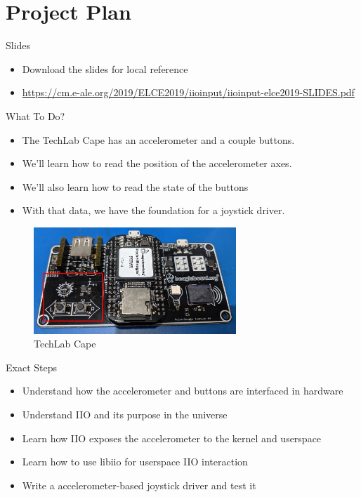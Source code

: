 \section{Project Plan}

\begin{frame}
	{Slides}

	\begin{itemize}
		\item
			Download the slides for local reference
		\item
			\url{https://cm.e-ale.org/2019/ELCE2019/iioinput/iioinput-elce2019-SLIDES.pdf}
	\end{itemize}
\end{frame}

\begin{frame}
	{What To Do?}

	\begin{itemize}
		\item
			The TechLab Cape has an accelerometer and a couple buttons.
		\item
			We'll learn how to read the position of the accelerometer axes.
		\item
			We'll also learn how to read the state of the buttons
		\item
			With that data, we have the foundation for a joystick driver.
	\end{itemize}

	     \begin{figure}[H]
		     \includegraphics[width=3in]{IMAGES/techlab-annotated}
				       \caption{TechLab Cape}
	     \end{figure}
\end{frame}


\begin{frame}
	{Exact Steps}
	\begin{itemize}
		\item
			Understand how the accelerometer and buttons are interfaced in hardware
		\item
			Understand IIO and its purpose in the universe
		\item
			Learn how IIO exposes the accelerometer to the kernel and userspace
		\item
			Learn how to use libiio for userspace IIO interaction
		\item
			Write a accelerometer-based joystick driver and test it
	\end{itemize}
\end{frame}

